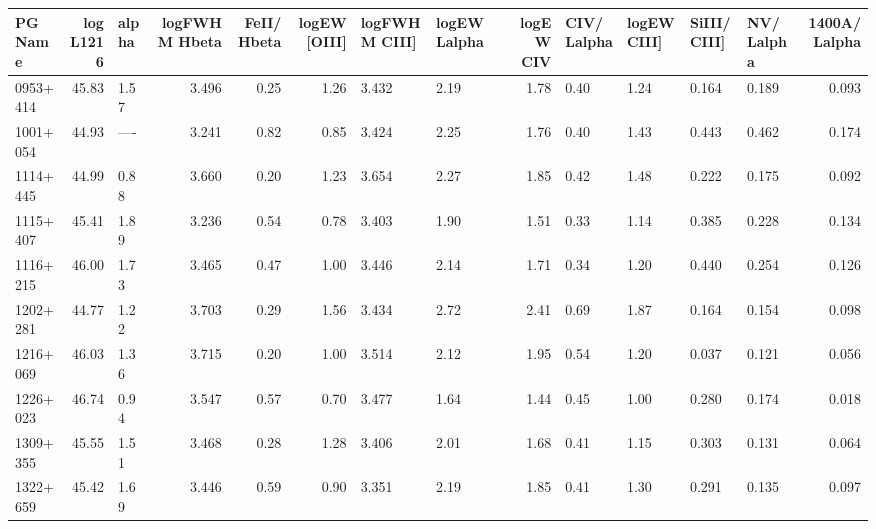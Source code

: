 \begin{tabular}{lrlrrrllrllllr}
\toprule
  PG Name &  log L1216 & alpha &  logFWHM Hbeta  &  FeII/ Hbeta  &  logEW [OIII] & logFWHM CIII] & logEW Lalpha &  logEW CIV & CIV/ Lalpha & logEW CIII] & SiIII/ CIII] & NV/ Lalpha &  1400A/ Lalpha \\
\midrule
 0953+414 &      45.83 &  1.57 &           3.496 &          0.25 &          1.26 &         3.432 &         2.19 &       1.78 &        0.40 &        1.24 &        0.164 &      0.189 &          0.093 \\
 1001+054 &      44.93 &  ---- &           3.241 &          0.82 &          0.85 &         3.424 &         2.25 &       1.76 &        0.40 &        1.43 &        0.443 &      0.462 &          0.174 \\
 1114+445 &      44.99 &  0.88 &           3.660 &          0.20 &          1.23 &         3.654 &         2.27 &       1.85 &        0.42 &        1.48 &        0.222 &      0.175 &          0.092 \\
 1115+407 &      45.41 &  1.89 &           3.236 &          0.54 &          0.78 &         3.403 &         1.90 &       1.51 &        0.33 &        1.14 &        0.385 &      0.228 &          0.134 \\
 1116+215 &      46.00 &  1.73 &           3.465 &          0.47 &          1.00 &         3.446 &         2.14 &       1.71 &        0.34 &        1.20 &        0.440 &      0.254 &          0.126 \\
 1202+281 &      44.77 &  1.22 &           3.703 &          0.29 &          1.56 &         3.434 &         2.72 &       2.41 &        0.69 &        1.87 &        0.164 &      0.154 &          0.098 \\
 1216+069 &      46.03 &  1.36 &           3.715 &          0.20 &          1.00 &         3.514 &         2.12 &       1.95 &        0.54 &        1.20 &        0.037 &      0.121 &          0.056 \\
 1226+023 &      46.74 &  0.94 &           3.547 &          0.57 &          0.70 &         3.477 &         1.64 &       1.44 &        0.45 &        1.00 &        0.280 &      0.174 &          0.018 \\
 1309+355 &      45.55 &  1.51 &           3.468 &          0.28 &          1.28 &         3.406 &         2.01 &       1.68 &        0.41 &        1.15 &        0.303 &      0.131 &          0.064 \\
 1322+659 &      45.42 &  1.69 &           3.446 &          0.59 &          0.90 &         3.351 &         2.19 &       1.85 &        0.41 &        1.30 &        0.291 &      0.135 &          0.097 \\

\end{tabular}
